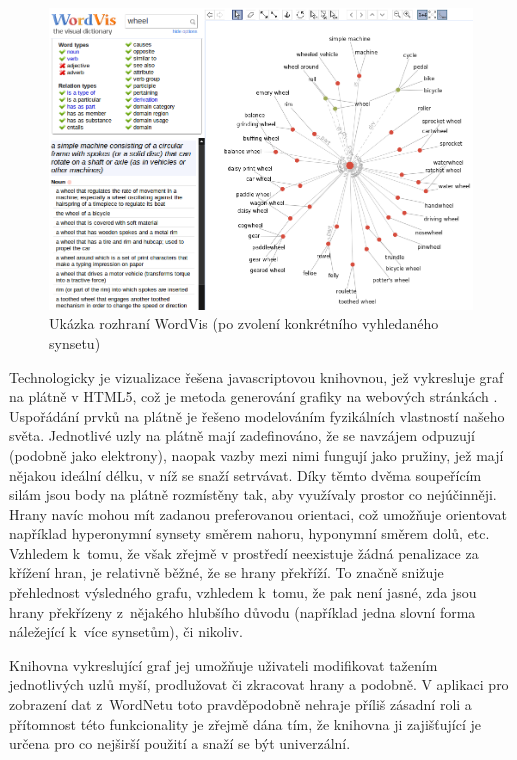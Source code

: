 \documentclass[a4paper, 11pt, oneside, showtrims]{book}
\begin{document}
					\begin{figure}[h]
						\centering
						\includegraphics[width=1.0\textwidth]{wordvis.png}
						\caption{Ukázka rozhraní WordVis (po zvolení konkrétního vyhledaného synsetu)}
						\label{fig:wordvis}
					\end{figure}

					Technologicky je vizualizace řešena javascriptovou knihovnou, jež vykresluje graf na plátně v HTML5, což je metoda generování grafiky na webových stránkách \parencite{w3schools2017htmlcanvas}. Uspořádání prvků na plátně je řešeno modelováním fyzikálních vlastností našeho světa. Jednotlivé uzly na plátně mají zadefinováno, že se navzájem odpuzují (podobně jako elektrony), naopak vazby mezi nimi fungují jako pružiny, jež mají nějakou ideální délku, v níž se snaží setrvávat. Díky těmto dvěma soupeřícím silám jsou body na plátně rozmístěny tak, aby využívaly prostor co nejúčinněji. Hrany navíc mohou mít zadanou preferovanou orientaci, což umožňuje orientovat například hyperonymní synsety směrem nahoru, hyponymní směrem dolů, etc. \parencite{wordvis2010vercruysse} Vzhledem k~tomu, že však zřejmě v prostředí neexistuje žádná penalizace za křížení hran, je relativně běžné, že se hrany překříží. To značně snižuje přehlednost výsledného grafu, vzhledem k~tomu, že pak není jasné, zda jsou hrany překřízeny z~nějakého hlubšího důvodu (například jedna slovní forma náležející k~více synsetům), či nikoliv. 

					Knihovna vykreslující graf jej umožňuje uživateli modifikovat tažením jednotlivých uzlů myší, prodlužovat či zkracovat hrany a podobně. V aplikaci pro zobrazení dat z~WordNetu toto pravděpodobně nehraje příliš zásadní roli a přítomnost této funkcionality je zřejmě dána tím, že knihovna ji zajišťující je určena pro co nejširší použití a snaží se být univerzální. \parencite{wordvis2010vercruysse}
\end{document}
